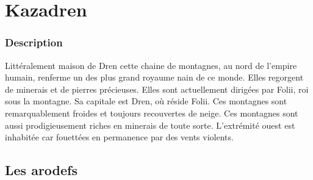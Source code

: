 
\section{Kazadren}
\subsubsection{Description}
\hypertarget{kazadren}{}Littéralement maison de Dren cette chaine de montagnes, au nord de l'empire humain, renferme un des plus grand royaume nain de ce monde.
Elles regorgent de minerais et de pierres précieuses. Elles sont actuellement dirigées par Folii, roi sous la montagne.
Sa capitale est Dren, où réside Folii. Ces montagnes sont remarquablement froides et toujours recouvertes de neige. 
Ces montagnes sont aussi prodigieusement riches en minerais de toute sorte. 
L'extrémité ouest est inhabitée car fouettées en permanence par des vents violents.
\subsection{Les arodefs}
